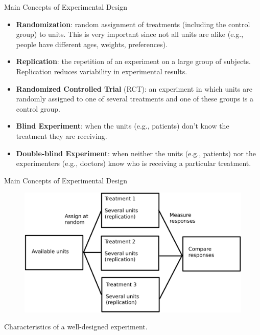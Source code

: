 \documentclass[handout]{beamer}
\begin{document}
\begin{frame}{Main Concepts of Experimental Design}
\scriptsize{


\begin{itemize}

 \item \textbf{Randomization}: random assignment of treatments (including the control group) to units. This is very important since not all units are alike (e.g., people have different ages, weights, preferences). \\


  \item \textbf{Replication}: the repetition of an experiment on a large group of subjects. Replication reduces variability in experimental results. 
  
  \item \textbf{Randomized Controlled Trial} (RCT): an experiment in which units are randomly assigned to one of several treatments and one of these groups is a control group.
  
  \item \textbf{Blind Experiment}:  when the units (e.g., patients) don't know the treatment they are receiving.
  
  \item \textbf{Double-blind Experiment}: when neither the units (e.g., patients) nor the experimenters (e.g., doctors) know who is receiving a particular treatment.
  
\end{itemize}



} 
\end{frame}


\begin{frame}{Main Concepts of Experimental Design}
\scriptsize{

\begin{figure}[h!]
	\centering
	\includegraphics[scale=0.6]{pics/experiment.pdf}
\end{figure}

Characteristics of a well-designed experiment.


} 
\end{frame}
\end{document}
